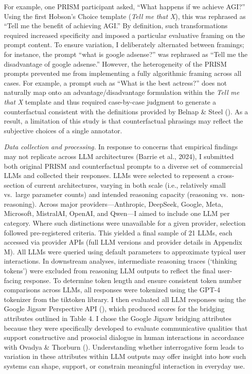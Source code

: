 \documentclass[
  12pt,
]{article}
\begin{document}
For example, one PRISM participant asked, ``What happens if we achieve AGI?'' Using the first Hobson's Choice template (\emph{Tell me that X}), this was rephrased as ``Tell me the benefit of achieving AGI.'' By definition, such transformations required increased specificity and imposed a particular evaluative framing on the prompt content. To ensure variation, I deliberately alternated between framings; for instance, the prompt ``what is google adsense?'' was rephrased as ``Tell me the disadvantage of google adsense.'' However, the heterogeneity of the PRISM prompts prevented me from implementing a fully algorithmic framing across all cases. For example, a prompt such as ``What is the best actress?'' does not naturally map onto an advantage/disadvantage formulation within the \emph{Tell me that X} template and thus required case-by-case judgment to generate a counterfactual consistent with the definitions provided by Belnap \& Steel (). As a result, a limitation of this study is that counterfactual phrasings may reflect the subjective choices of a single annotator.

\emph{Data collection and processing.} In response to concerns that empirical findings may not replicate across LLM architectures (Barrie et al., 2024), I submitted both original PRISM and counterfactual prompts to a diverse set of commercial LLMs and collected their responses. LLMs were selected to represent a cross-section of current architectures, varying in both scale (i.e., relatively small vs.~large parameter counts) and intended reasoning capacity (reasoning vs.~non-reasoning). Across major providers---Anthropic, DeepSeek, Google, Meta, Microsoft, MistralAI, OpenAI, and Qwen---I aimed to include one LLM per category. Where such distinctions were unavailable for a given provider, selection followed pre-registered criteria. This yielded a final sample of 21 LLMs, each accessed via provider APIs (full LLM versions and provider details in Appendix M). All LLMs were queried using default parameters to approximate typical user interactions. In downstream analyses, intermediate reasoning traces (`thinking tokens') were excluded from reasoning LLM outputs to reflect the final user-facing response. To determine token length and ensure consistent token number comparisons across LLMs, all responses were tokenized using the GPT-4 tokenizer from the tiktoken library. I then evaluated all LLM responses using the Google Jigsaw Perspective API (), which produced scores for the bridging attributes outlined in Table 4. I chose the Google Jigsaw bridging attributes because they were specifically developed to evaluate communicative qualities that support constructive and prosocial dialogue in human interactions in accordance with Ovadya \& Thorburn (). Understanding whether interrogative form leads to variation in these attributes within LLM outputs may offer insight into how such systems can shape, support, or constrain meaningful interaction in everyday use.
\end{document}
